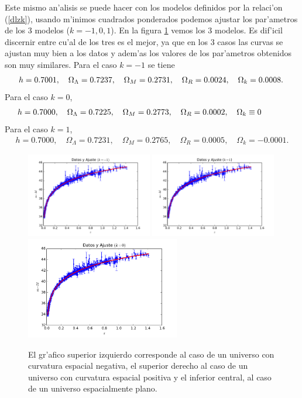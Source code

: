 Este mismo an'alisis se puede hacer con los modelos definidos por la relaci'on (\ref{dlzk}), usando m'inimos cuadrados ponderados podemos ajustar 
los par'ametros de los 3 modelos ($k=-1,0,1$). En la figura \ref{datosyajustes} vemos los 3 modelos. Es dif'icil discernir entre cu'al de los tres
es el mejor, ya que en los 3 casos las curvas se ajustan muy bien a los datos y adem'as los valores de los par'ametros obtenidos son muy similares. Para el caso $k=-1$ se tiene
\begin{eqnarray}
h=0.7001,\quad\Omega_\Lambda=0.7237,\quad\Omega_M=0.2731,\quad\Omega_R=0.0024,\quad\Omega_k=0.0008.\hspace{0.1cm} 
\end{eqnarray}
Para el caso $k=0$,
\begin{eqnarray}
h=0.7000,\quad\Omega_\Lambda=0.7225,\quad\Omega_M=0.2773,\quad\Omega_R=0.0002,\quad\Omega_k\equiv0\hspace{1.1cm}
\end{eqnarray}
Para el caso $k=1$,
\begin{eqnarray}
h=0.7000,\quad\Omega_\Lambda=0.7231,\quad\Omega_M=0.2765,\quad\Omega_R=0.0005,\quad\Omega_k=-0.0001.
\end{eqnarray}
\begin{figure}[h!]
  \centering
\includegraphics[width=0.49\textwidth]{fig/datos-y-ajustek-1.pdf}
\includegraphics[width=0.49\textwidth]{fig/datos-y-ajustek1.pdf}
\includegraphics[width=0.60\textwidth]{fig/datos-y-ajuste.pdf}
 \caption{El gr'afico superior izquierdo corresponde al caso de un universo con curvatura espacial negativa, el superior
 derecho al caso de un universo con curvatura espacial positiva y el inferior central, al caso de un universo espacialmente plano.}
  \label{datosyajustes}
\end{figure}\\
